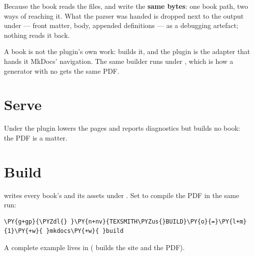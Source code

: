 \documentclass[a4paper,twoside]{article}
\begin{document}
Because the book reads the files,  and
\hyperref[the-book-is-a-command]{} write the \textbf{same bytes}: one
book path, two ways of reaching it. What the parser was handed is dropped next
to the output under  --- front matter, body,
appended definitions --- as a debugging artefact; nothing reads it back.

A book is not the plugin's own work:  builds it, and the
plugin is the adapter that hands it MkDocs' navigation. The same builder runs
under \hyperref[the-book-is-a-command]{}, which is how a
generator with no  gets the same PDF.
\section{Serve}
Under  the plugin lowers the pages and reports diagnostics but
builds no book: the PDF is a  matter.
\section{Build}
 writes every book's  and its assets under . Set
 to compile the PDF in the same run:
\begin{tscode}[lang=console, engine=pygments]
\begin{Verbatim}[commandchars=\\\{\},breaklines, breakanywhere, commandchars=\\\{\}]
\PY{g+gp}{\PYZdl{} }\PY{n+nv}{TEXSMITH\PYZus{}BUILD}\PY{o}{=}\PY{l+m}{1}\PY{+w}{ }mkdocs\PY{+w}{ }build
\end{Verbatim}
\end{tscode}
A complete example lives in  ( builds
the site and the PDF).
\end{document}
